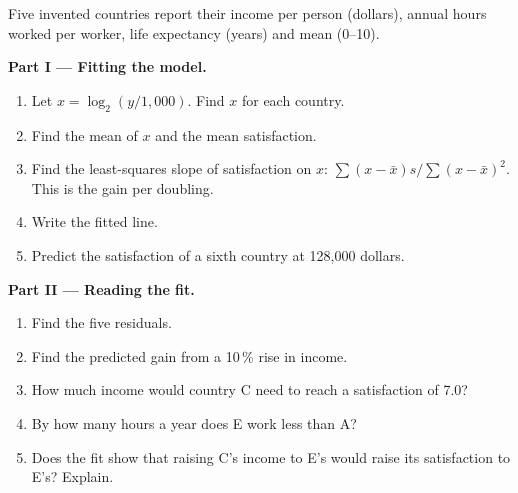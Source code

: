 \begin{problem}
\label{pb:g12:income-and-wellbeing:1}
Five invented countries report their income per person (dollars), annual hours worked per worker, life expectancy (years) and mean  (0--10).

\begin{center}
\small
{}
\end{center}

\medskip
\noindent\textbf{Part I --- Fitting the model.}
\begin{enumerate}
\item Let $x = \log_2(y/1{,}000)$. Find $x$ for each country.
\item Find the mean of $x$ and the mean satisfaction.
\item Find the least-squares slope of satisfaction on $x$: $\sum (x - \bar x) s / \sum (x - \bar x)^2$. This is the gain per doubling.
\item Write the fitted line.
\item Predict the satisfaction of a sixth country at 128,000 dollars.
\end{enumerate}

\medskip
\noindent\textbf{Part II --- Reading the fit.}
\begin{enumerate}[resume]
\item Find the five residuals.
\item Find the predicted gain from a 10\,\% rise in income.
\item How much income would country C need to reach a satisfaction of 7.0?
\item By how many hours a year does E work less than A?
\item Does the fit show that raising C's income to E's would raise its satisfaction to E's? Explain.
\end{enumerate}


\end{problem}
